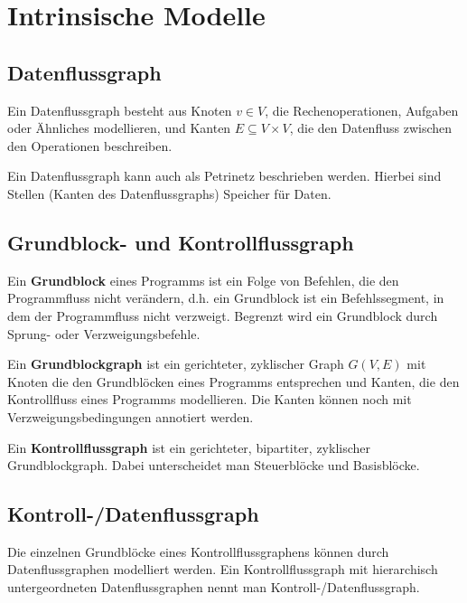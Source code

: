 \chapter{Intrinsische Modelle}
\section{Datenflussgraph}
Ein Datenflussgraph besteht aus Knoten $v \in V$, die Rechenoperationen, Aufgaben
oder Ähnliches modellieren, und Kanten $E \subseteq V \times V$, die den Datenfluss
zwischen den Operationen beschreiben.

Ein Datenflussgraph kann auch als Petrinetz beschrieben werden. Hierbei sind
Stellen (Kanten des Datenflussgraphs) Speicher für Daten.

\section{Grundblock- und Kontrollflussgraph}
\begin{tcolorbox}
    Ein \textbf{Grundblock} eines Programms ist ein Folge von Befehlen,
    die den Programmfluss nicht verändern, d.h. ein Grundblock ist ein
    Befehlssegment, in dem der Programmfluss nicht verzweigt. Begrenzt wird ein
    Grundblock durch Sprung- oder Verzweigungsbefehle.
\end{tcolorbox}

\begin{tcolorbox}
    Ein \textbf{Grundblockgraph} ist ein gerichteter, zyklischer Graph $G(V, E)$ mit Knoten
    die den Grundblöcken eines Programms entsprechen und Kanten, die den Kontrollfluss
    eines Programms modellieren. Die Kanten können noch mit Verzweigungsbedingungen
    annotiert werden.
\end{tcolorbox}

\begin{tcolorbox}
    Ein \textbf{Kontrollflussgraph} ist ein gerichteter, bipartiter, zyklischer
    Grundblockgraph. Dabei unterscheidet man Steuerblöcke und Basisblöcke.
\end{tcolorbox}

\section{Kontroll-/Datenflussgraph}
Die einzelnen Grundblöcke eines Kontrollflussgraphens können durch Datenflussgraphen
modelliert werden. Ein Kontrollflussgraph mit hierarchisch untergeordneten
Datenflussgraphen nennt man Kontroll-/Datenflussgraph.
